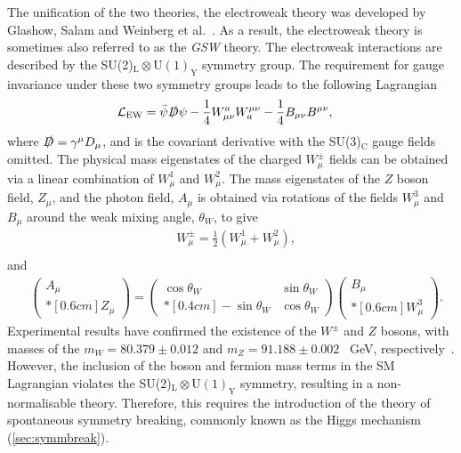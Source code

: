 The unification of the two theories, the electroweak theory was developed by Glashow, Salam and Weinberg et al.~\cite{Glashow1959,Salam1959,Weinberg1967}. As a result, the electroweak theory is sometimes also referred to as the \emph{GSW} theory. The electroweak interactions are described by the SU(2)$_\mathrm{L}\otimes\mathrm{U(1)}_\mathrm{Y}$ symmetry group. The requirement for gauge invariance under these two symmetry groups leads to the following Lagrangian
\begin{equation}
    \label{eq:lagrangianEW}
    \begin{aligned}
        & \mathcal{L}_\mathrm{EW} = \bar{\psi}\slashed{D}\psi - \frac{1}{4}W^a_{\mu\nu}W_a^{\mu\nu} - \frac{1}{4}B_{\mu\nu}B^{\mu\nu},
     \end{aligned}
\end{equation}
where $\slashed{D} = \gamma^\mu D_\mu$, and is the covariant derivative with the SU(3)$_\mathrm{C}$ gauge fields omitted. The physical mass eigenstates of the charged $W^\pm_\mu$ fields can be obtained via a linear combination of $W^1_\mu$ and $W^2_\mu$. The mass eigenstates of the $Z$ boson field, $Z_\mu$, and the photon field, $A_\mu$ is obtained via rotations of the fields $W_\mu^3$ and $B_\mu$ around the weak mixing angle, $\theta_W$, to give
\begin{equation}\renewcommand*{\arraystretch}{\newarraystrech}
    \label{eq:wbosonFields}
    \begin{aligned}
        & W^\pm_\mu = \frac{1}{2} \left(W^1_\mu + W^2_\mu \right), \\
     \end{aligned}
\end{equation}
and 
\begin{equation}\renewcommand*{\arraystretch}{\newarraystrech}
    \label{eq:zbosonFields}
    \begin{aligned}
        & \begin{pmatrix}
            A_\mu \\*[0.6cm]
            Z_\mu
        \end{pmatrix} = \begin{pmatrix}
            \cos \theta_W & \sin \theta_W \\*[0.4cm]
            -\sin \theta_W & \cos \theta_W
        \end{pmatrix} \begin{pmatrix}
            B_\mu \\*[0.6cm]
            W_\mu^3
        \end{pmatrix}.
     \end{aligned}
\end{equation}
Experimental results have confirmed the existence of the $W^\pm$ and $Z$ bosons, with masses of the $m_W = 80.379 \pm 0.012$ and $m_Z = 91.188 \pm 0.002$ \SI{}{\giga\electronvolt}, respectively~\cite{PDG}. However, the inclusion of the boson and fermion mass terms in the SM Lagrangian violates the SU(2)$_\mathrm{L} \otimes \mathrm{U(1)}_\mathrm{Y}$ symmetry, resulting in a non-normalisable theory. Therefore, this requires the introduction of the theory of spontaneous symmetry breaking, commonly known as the Higgs mechanism (\cref{sec:symmbreak}).

